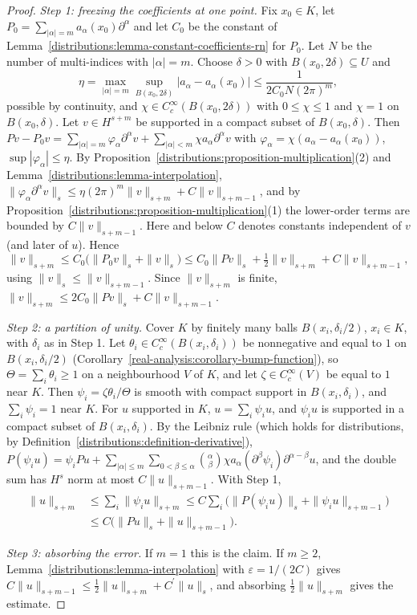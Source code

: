 \begin{proof}
\emph{Step 1: freezing the coefficients at one point.} Fix $x_0 \in K$, let $P_0 = \sum_{|\alpha| = m}a_\alpha(x_0)\partial^\alpha$ and let $C_0$ be the constant of Lemma~\ref{distributions:lemma-constant-coefficients-rn} for $P_0$. Let
$N$ be the number of multi-indices with $|\alpha| = m$. Choose $\delta > 0$ with $B(x_0, 2\delta) \subseteq U$ and
\[
\eta = \max_{|\alpha| = m}\sup_{B(x_0, 2\delta)}|a_\alpha - a_\alpha(x_0)| \leq \frac{1}{2C_0N(2\pi)^m},
\]
possible by continuity, and $\chi \in C_c^\infty(B(x_0, 2\delta))$ with $0 \leq \chi \leq 1$ and $\chi = 1$ on $B(x_0, \delta)$. Let $v \in H^{s+m}$ be supported in a compact subset of $B(x_0, \delta)$. Then
$Pv - P_0v = \sum_{|\alpha| = m}\varphi_\alpha\partial^\alpha v + \sum_{|\alpha| < m}\chi a_\alpha\partial^\alpha v$ with $\varphi_\alpha = \chi(a_\alpha - a_\alpha(x_0))$, $\sup|\varphi_\alpha| \leq \eta$. By
Proposition~\ref{distributions:proposition-multiplication}(2) and Lemma~\ref{distributions:lemma-interpolation}, $\|\varphi_\alpha\partial^\alpha v\|_s \leq \eta(2\pi)^m\|v\|_{s+m} + C\|v\|_{s+m-1}$, and by
Proposition~\ref{distributions:proposition-multiplication}(1) the lower-order terms are bounded by $C\|v\|_{s+m-1}$. Here and below $C$ denotes constants independent of $v$ (and later of $u$). Hence
\[
\|v\|_{s+m} \leq C_0\bigl(\|P_0v\|_s + \|v\|_s\bigr) \leq C_0\|Pv\|_s + \tfrac12\|v\|_{s+m} + C\|v\|_{s+m-1},
\]
using $\|v\|_s \leq \|v\|_{s+m-1}$. Since $\|v\|_{s+m}$ is finite, $\|v\|_{s+m} \leq 2C_0\|Pv\|_s + C\|v\|_{s+m-1}$.

\emph{Step 2: a partition of unity.} Cover $K$ by finitely many balls $B(x_i, \delta_i/2)$, $x_i \in K$, with $\delta_i$ as in Step 1. Let $\theta_i \in C_c^\infty(B(x_i, \delta_i))$ be nonnegative and equal to $1$ on
$B(x_i, \delta_i/2)$ (Corollary~\ref{real-analysis:corollary-bump-function}), so $\Theta = \sum_i\theta_i \geq 1$ on a neighbourhood $V$ of $K$, and let $\zeta \in C_c^\infty(V)$ be equal to $1$ near $K$. Then
$\psi_i = \zeta\theta_i/\Theta$ is smooth with compact support in $B(x_i, \delta_i)$, and $\sum_i\psi_i = 1$ near $K$. For $u$ supported in $K$, $u = \sum_i\psi_iu$, and $\psi_iu$ is supported in a compact
subset of $B(x_i, \delta_i)$. By the Leibniz rule (which holds for distributions, by Definition~\ref{distributions:definition-derivative}),
$P(\psi_iu) = \psi_iPu + \sum_{|\alpha| \leq m}\sum_{0 < \beta \leq \alpha}\binom{\alpha}{\beta}\chi a_\alpha(\partial^\beta\psi_i)\partial^{\alpha - \beta}u$, and the double sum has $H^s$ norm at most $C\|u\|_{s+m-1}$. With Step 1,
\[
\begin{aligned}
\|u\|_{s+m} &\leq \sum_i\|\psi_iu\|_{s+m} \leq C\sum_i\bigl(\|P(\psi_iu)\|_s + \|\psi_iu\|_{s+m-1}\bigr) \\
&\leq C\bigl(\|Pu\|_s + \|u\|_{s+m-1}\bigr).
\end{aligned}
\]

\emph{Step 3: absorbing the error.} If $m = 1$ this is the claim. If $m \geq 2$, Lemma~\ref{distributions:lemma-interpolation} with $\varepsilon = 1/(2C)$ gives $C\|u\|_{s+m-1} \leq \frac12\|u\|_{s+m} + C^{\prime}\|u\|_s$, and
absorbing $\frac12\|u\|_{s+m}$ gives the estimate.
\end{proof}

